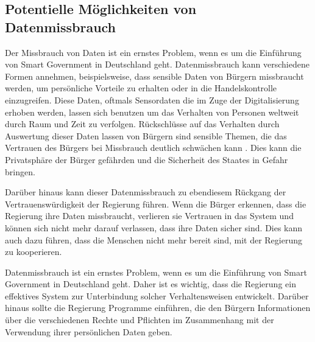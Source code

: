 \subsection{Potentielle Möglichkeiten von Datenmissbrauch}
Der Missbrauch von Daten ist ein ernstes Problem, wenn es um die Einführung von Smart Government in Deutschland geht.
Datenmissbrauch kann verschiedene Formen annehmen, beispielsweise, dass sensible Daten von Bürgern missbraucht werden, um persönliche Vorteile zu erhalten oder in die Handelskontrolle einzugreifen.
Diese Daten, oftmals Sensordaten die im Zuge der Digitalisierung erhoben werden, lassen sich benutzen um das Verhalten von Personen weltweit durch Raum und Zeit zu verfolgen.
Rückschlüsse auf das Verhalten durch Auswertung dieser Daten lassen von Bürgern sind sensible Themen, die das Vertrauen des Bürgers bei Missbrauch deutlich schwächen kann \citep[Vgl.][S.179]{von_Lucke_2016}.
Dies kann die Privatsphäre der Bürger gefährden und die Sicherheit des Staates in Gefahr bringen.
\par
Darüber hinaus kann dieser Datenmissbrauch zu ebendiesem Rückgang der Vertrauenswürdigkeit der Regierung führen.
Wenn die Bürger erkennen, dass die Regierung ihre Daten missbraucht, verlieren sie Vertrauen in das System und können sich nicht mehr darauf verlassen, dass ihre Daten sicher sind.
Dies kann auch dazu führen, dass die Menschen nicht mehr bereit sind, mit der Regierung zu kooperieren.
\par
Datenmissbrauch ist ein ernstes Problem, wenn es um die Einführung von Smart Government in Deutschland geht.
Daher ist es wichtig, dass die Regierung ein effektives System zur Unterbindung solcher Verhaltensweisen entwickelt.
Darüber hinaus sollte die Regierung Programme einführen, die den Bürgern Informationen über die verschiedenen Rechte und Pflichten im Zusammenhang mit der Verwendung ihrer persönlichen Daten geben.